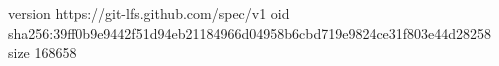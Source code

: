 version https://git-lfs.github.com/spec/v1
oid sha256:39ff0b9e9442f51d94eb21184966d04958b6cbd719e9824ce31f803e44d28258
size 168658
